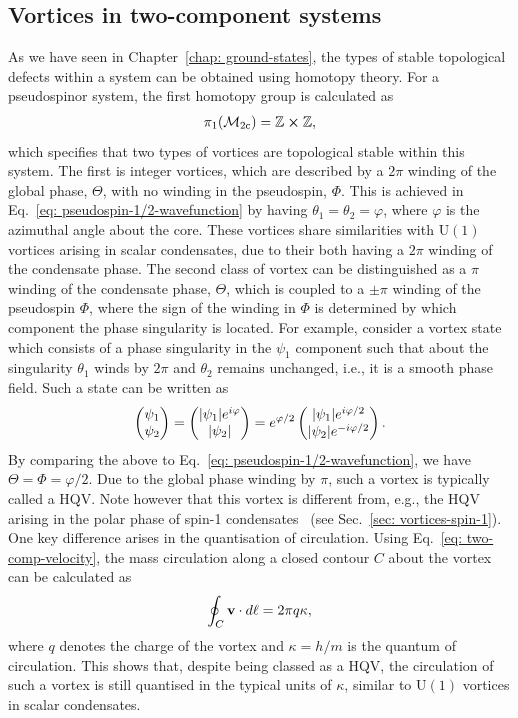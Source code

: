 \subsection{Vortices in two-component systems}
As we have seen in Chapter~\ref{chap: ground-states}, the types of stable
topological defects within a system can be obtained using homotopy theory.
For a pseudospinor system, the first homotopy group is calculated
as~\cite{Eto2011}
\begin{align}
    \pi_1(\mathcal{M}_\text{2c}) = \mathbb{Z} \cross \mathbb{Z},
\end{align}
which specifies that two types of vortices are topological stable within this
system.
The first is integer vortices, which are described by a \(2\pi \) winding of
the global phase, \(\Theta \), with no winding in the pseudospin, \(\Phi \).
This is achieved in Eq.~\eqref{eq: pseudospin-1/2-wavefunction} by having
\(\theta_1=\theta_2=\varphi \), where \(\varphi \) is the azimuthal angle
about the core.
These vortices share similarities with \(\text{U}(1)\) vortices arising in
scalar condensates, due to their both having a \(2\pi \) winding of the
condensate phase.
The second class of vortex can be distinguished as a \(\pi \) winding of the
condensate phase, \(\Theta \), which is coupled to a \(\pm\pi \) winding of the
pseudospin \(\Phi \), where the sign of the winding in \(\Phi \) is determined
by which component the phase singularity is located.
For example, consider a vortex state which consists of a phase singularity in
the \(\psi_1 \) component such that about the singularity \( \theta_1 \) winds
by \( 2\pi \) and \( \theta_2 \) remains unchanged, i.e., it is a smooth phase
field.
Such a state can be written as
\begin{equation}
    \begin{pmatrix}\psi_1\\\psi_2\end{pmatrix}
    = \begin{pmatrix}|\psi_1|e^{i\varphi}\\|\psi_2|\end{pmatrix}
    = e^{\varphi/2}\begin{pmatrix}|\psi_1|e^{i\varphi/2}\\|\psi_2|e^{-i\varphi/2}\end{pmatrix}.
\end{equation}
By comparing the above to Eq.~\eqref{eq: pseudospin-1/2-wavefunction}, we have
\( \Theta=\Phi=\varphi/2 \).
Due to the global phase winding by \(\pi \), such a vortex is typically called
a HQV\@.
Note however that this vortex is different from, e.g., the HQV arising in the
polar phase of spin-1 condensates~\cite{Leonhardt2000, Seo2015} (see
Sec.~\ref{sec: vortices-spin-1}).
One key difference arises in the quantisation of circulation.
Using Eq.~\eqref{eq: two-comp-velocity}, the mass circulation along a closed
contour \(C\) about the vortex can be calculated as
\begin{equation}
    \oint_C\vb{v}\cdot d\vb{\ell} = 2\pi q\kappa,
\end{equation}
where \( q \) denotes the charge of the vortex and \(\kappa=h/m\) is the
quantum of circulation.
This shows that, despite being classed as a HQV, the circulation of such a
vortex is still quantised in the typical units of \(\kappa \), similar to
\(\text{U}(1)\) vortices in scalar condensates.


